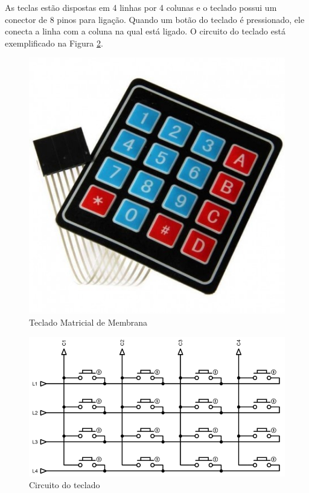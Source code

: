 As teclas estão dispostas em 4 linhas por 4 colunas e o teclado possui um conector de 8 pinos para ligação. Quando um botão do teclado é pressionado, ele conecta a linha com a coluna na qual está ligado. O circuito do teclado está exemplificado na Figura \ref{fig:teclado-conexoes}.

\begin{figure}[htbp]
	\centering
	\includegraphics[scale=0.3]{figuras/teclado-matricial.jpg}
	\caption{Teclado Matricial de Membrana}
	\label{fig:teclado}
\end{figure}

\begin{figure}[htbp]
	\centering
	\includegraphics[scale=0.4]{figuras/matrix-1024x558.png}
	\caption{Circuito do teclado}
	\label{fig:teclado-conexoes}
\end{figure}

